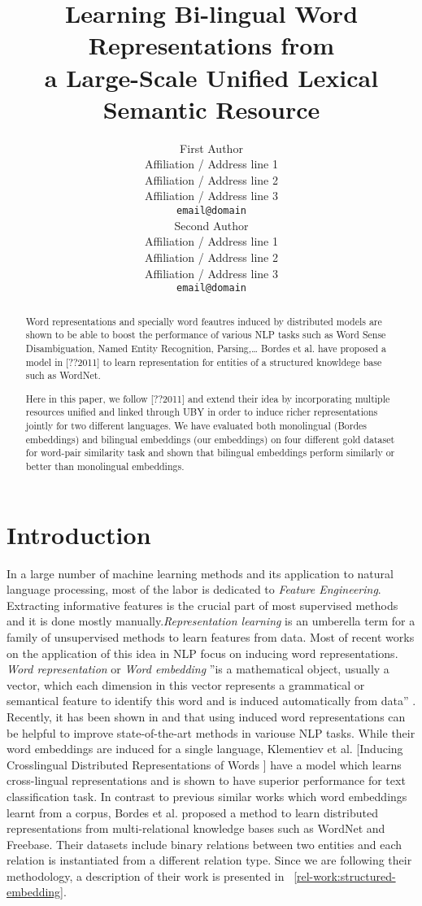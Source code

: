 \documentclass[11pt]{article}
\title{Learning Bi-lingual Word Representations from \\a Large-Scale Unified
Lexical Semantic Resource}
\author{First Author \\
  Affiliation / Address line 1 \\
  Affiliation / Address line 2 \\
  Affiliation / Address line 3 \\
  {\tt email@domain} \\\And
  Second Author \\
  Affiliation / Address line 1 \\
  Affiliation / Address line 2 \\
  Affiliation / Address line 3 \\
  {\tt email@domain} \\}
\date{}
\begin{document}
\maketitle
\begin{abstract}
  Word representations and specially word feautres induced by distributed models
  are shown to be able to boost the performance of various NLP tasks such as
  Word Sense Disambiguation, Named Entity Recognition, Parsing,\ldots
  Bordes et al. have proposed a model in [??2011] to learn
  representation for entities of a structured knowldege base such as WordNet.
  
  Here in this paper, we follow [??2011] and extend their idea by
  incorporating multiple resources unified and linked through UBY
  in order to induce richer representations jointly for two different languages.  
  We have evaluated both monolingual (Bordes embeddings) and bilingual embeddings (our embeddings) on four different gold dataset
for word-pair similarity task and shown that bilingual embeddings perform similarly or better than monolingual embeddings.
\end{abstract}


\section{Introduction}

In a large number of machine learning methods and its application to natural language processing,
 most of the labor is dedicated to \emph{Feature Engineering}. Extracting informative features is the crucial part
of most supervised methods and it is done mostly manually.\emph{Representation learning} is an umberella term
for a family of unsupervised methods to learn features from data. Most of recent
works on the application of this idea in NLP focus on inducing word
representations. \emph{Word representation} or \emph{Word embedding} ''is a mathematical object, usually a
vector, which each dimension in this vector represents a grammatical or
semantical feature to identify this word and is induced automatically from data''
\cite{Turian2010b}. Recently, it has been shown in \cite{Turian2010b} and \cite{Collobert2011} that using
 induced word representations can be helpful to improve state-of-the-art methods in 
variouse NLP tasks. While their word embeddings are induced for a single
language, Klementiev et al.
[Inducing Crosslingual Distributed Representations of Words ] have a model which
learns cross-lingual representations and is shown to have superior performance
for text classification task. In contrast to previous similar works which word
embeddings learnt from a corpus, Bordes et al. proposed a method
\cite{Bordes2011} to learn distributed representations from multi-relational knowledge bases such as WordNet and Freebase.
 Their datasets include binary relations between two entities and each relation
 is instantiated from a different relation type. Since we are following their methodology, a description of their work is presented
 in ~\ref{rel-work:structured-embedding}.
 
\end{document}
